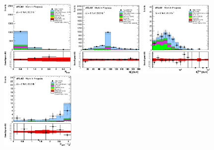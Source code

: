 \begin{figure}[ht!]
\centering
\includegraphics[width=0.32\textwidth]{figures/appendix_signal_selection/Nov24Update_FakeSys_KFacSys_LinearY_Rebin/output/jobs/MxM/DataFull_Rates_May13_FakeRatesExactly2Loose_MuonMxMBJetGt0_ElBJetGt0SubtractPC_MxM/PreselectionNov23_15_2SFOS_ChargeAbs1_physics/weight_all/eps/NBTaggedJets_histratio.eps}
\includegraphics[width=0.32\textwidth]{figures/appendix_signal_selection/Nov24Update_FakeSys_KFacSys_LinearY_Rebin/output/jobs/MxM/DataFull_Rates_May13_FakeRatesExactly2Loose_MuonMxMBJetGt0_ElBJetGt0SubtractPC_MxM/PreselectionNov23_15_2SFOS_ChargeAbs1_BVeto85_physics/weight_all/eps/InvariantMassSFOS_histratio.eps}
\includegraphics[width=0.32\textwidth]{figures/appendix_signal_selection/Nov24Update_FakeSys_KFacSys_LinearY_Rebin/output/jobs/MxM/DataFull_Rates_May13_FakeRatesExactly2Loose_MuonMxMBJetGt0_ElBJetGt0SubtractPC_MxM/PreselectionNov23_15_2SFOS_ChargeAbs1_BVeto85_ZVeto20GeV_physics/weight_all/eps/MET_Et_histratio.eps}
\includegraphics[width=0.32\textwidth]{figures/appendix_signal_selection/Nov24Update_FakeSys_KFacSys_LinearY_Rebin/output/jobs/MxM/DataFull_Rates_May13_FakeRatesExactly2Loose_MuonMxMBJetGt0_ElBJetGt0SubtractPC_MxM/PreselectionNov23_15_2SFOS_ChargeAbs1_BVeto85_ZVeto20GeV_METGt55GeV_physics/weight_all/eps/DeltaPhiMET123_Abs_histratio.eps}

\end{figure}
